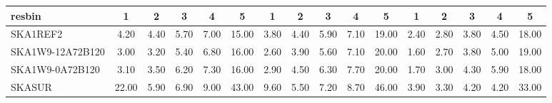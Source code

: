\begin{table}[!htp]
{{\begin{tabular}{|lccccc||ccccc||ccccc|}
 resbin  &1 & 2 & 3 & 4 & 5 & 1 & 2 & 3 & 4 & 5 & 1 & 2 & 3 & 4 & 5 \tabularnewline \hline
SKA1REF2 & 4.20 \cellcolor{blue!20.65} & 4.40 \cellcolor{red!36.67} & 5.70 \cellcolor{green!26.40} & 7.00 \cellcolor{orange!21.82} & 15.00 \cellcolor{purple!18.00} & 3.80 \cellcolor{blue!25.20} & 4.40 \cellcolor{red!31.13} & 5.90 \cellcolor{green!25.88} & 7.10 \cellcolor{orange!18.00} & 19.00 \cellcolor{purple!18.00} & 2.40 \cellcolor{blue!32.61} & 2.80 \cellcolor{red!25.00} & 3.80 \cellcolor{green!18.00} & 4.50 \cellcolor{orange!25.41} & 18.00 \cellcolor{purple!18.00}\\ \hline 
SKA1W9-12A72B120 & 3.00 \cellcolor{blue!18.00} & 3.20 \cellcolor{red!18.00} & 5.40 \cellcolor{green!18.00} & 6.80 \cellcolor{orange!18.00} & 16.00 \cellcolor{purple!19.50} & 2.60 \cellcolor{blue!18.00} & 3.90 \cellcolor{red!18.00} & 5.60 \cellcolor{green!18.00} & 7.10 \cellcolor{orange!18.00} & 20.00 \cellcolor{purple!19.56} & 1.60 \cellcolor{blue!18.00} & 2.70 \cellcolor{red!18.00} & 3.80 \cellcolor{green!18.00} & 5.00 \cellcolor{orange!37.76} & 19.00 \cellcolor{purple!20.80}\\ \hline 
SKA1W9-0A72B120 & 3.10 \cellcolor{blue!18.22} & 3.50 \cellcolor{red!22.67} & 6.20 \cellcolor{green!40.40} & 7.30 \cellcolor{orange!27.55} & 16.00 \cellcolor{purple!19.50} & 2.90 \cellcolor{blue!19.80} & 4.50 \cellcolor{red!33.75} & 6.30 \cellcolor{green!36.38} & 7.70 \cellcolor{orange!33.75} & 20.00 \cellcolor{purple!19.56} & 1.70 \cellcolor{blue!19.83} & 3.00 \cellcolor{red!39.00} & 4.30 \cellcolor{green!60.00} & 5.90 \cellcolor{orange!60.00} & 18.00 \cellcolor{purple!18.00}\\ \hline 
SKASUR & 22.00 \cellcolor{blue!60.00} & 5.90 \cellcolor{red!60.00} & 6.90 \cellcolor{green!60.00} & 9.00 \cellcolor{orange!60.00} & 43.00 \cellcolor{purple!60.00} & 9.60 \cellcolor{blue!60.00} & 5.50 \cellcolor{red!60.00} & 7.20 \cellcolor{green!60.00} & 8.70 \cellcolor{orange!60.00} & 46.00 \cellcolor{purple!60.00} & 3.90 \cellcolor{blue!60.00} & 3.30 \cellcolor{red!60.00} & 4.20 \cellcolor{green!51.60} & 4.20 \cellcolor{orange!18.00} & 33.00 \cellcolor{purple!60.00}\tabularnewline \hline 
\end{tabular}}\hfil 
{}}
\end{table}
